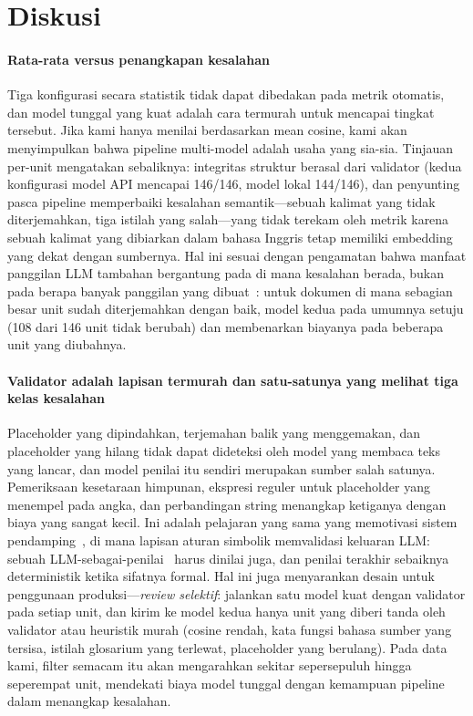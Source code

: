 \section{Diskusi}
\label{sec:discussion}

\paragraph{Rata-rata versus penangkapan kesalahan}
Tiga konfigurasi secara statistik tidak dapat dibedakan pada metrik otomatis, dan model tunggal yang kuat adalah cara termurah untuk mencapai tingkat tersebut. Jika kami hanya menilai berdasarkan mean cosine, kami akan menyimpulkan bahwa pipeline multi-model adalah usaha yang sia-sia. Tinjauan per-unit mengatakan sebaliknya: integritas struktur berasal dari validator (kedua konfigurasi model API mencapai 146/146, model lokal 144/146), dan penyunting pasca pipeline memperbaiki kesalahan semantik---sebuah kalimat yang tidak diterjemahkan, tiga istilah yang salah---yang tidak terekam oleh metrik karena sebuah kalimat yang dibiarkan dalam bahasa Inggris tetap memiliki embedding yang dekat dengan sumbernya. Hal ini sesuai dengan pengamatan bahwa manfaat panggilan LLM tambahan bergantung pada di mana kesalahan berada, bukan pada berapa banyak panggilan yang dibuat~\cite{chen2024compound}: untuk dokumen di mana sebagian besar unit sudah diterjemahkan dengan baik, model kedua pada umumnya setuju (108 dari 146 unit tidak berubah) dan membenarkan biayanya pada beberapa unit yang diubahnya.

\paragraph{Validator adalah lapisan termurah dan satu-satunya yang melihat tiga kelas kesalahan}
Placeholder yang dipindahkan, terjemahan balik yang menggemakan, dan placeholder yang hilang tidak dapat dideteksi oleh model yang membaca teks yang lancar, dan model penilai itu sendiri merupakan sumber salah satunya. Pemeriksaan kesetaraan himpunan, ekspresi reguler untuk placeholder yang menempel pada angka, dan perbandingan string menangkap ketiganya dengan biaya yang sangat kecil. Ini adalah pelajaran yang sama yang memotivasi sistem pendamping~\cite{arya2026wizard}, di mana lapisan aturan simbolik memvalidasi keluaran LLM: sebuah LLM-sebagai-penilai~\cite{zheng2023judge} harus dinilai juga, dan penilai terakhir sebaiknya deterministik ketika sifatnya formal. Hal ini juga menyarankan desain untuk penggunaan produksi---\emph{review selektif}: jalankan satu model kuat dengan validator pada setiap unit, dan kirim ke model kedua hanya unit yang diberi tanda oleh validator atau heuristik murah (cosine rendah, kata fungsi bahasa sumber yang tersisa, istilah glosarium yang terlewat, placeholder yang berulang). Pada data kami, filter semacam itu akan mengarahkan sekitar sepersepuluh hingga seperempat unit, mendekati biaya model tunggal dengan kemampuan pipeline dalam menangkap kesalahan.

